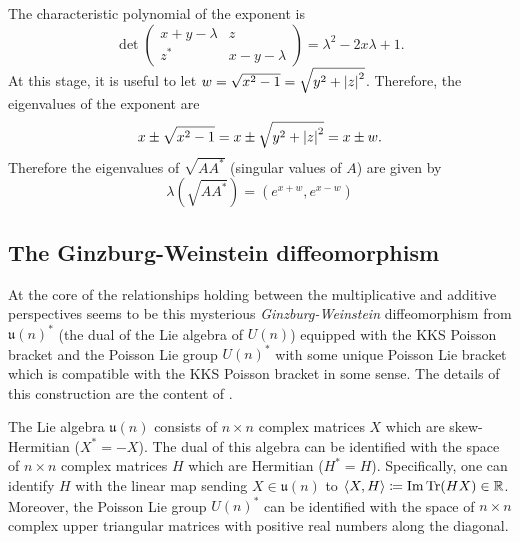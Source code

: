 \documentclass[notitlepage]{article}
\begin{document}
The characteristic polynomial of the exponent is
\begin{equation}
    \det\begin{pmatrix} x+y-\lambda & z \\ z^* & x-y-\lambda \end{pmatrix} = \lambda^2 - 2x \lambda + 1.
\end{equation}
At this stage, it is useful to let $w = \sqrt{x^2 - 1} = \sqrt{y^2 + \left|z\right|^2}$.
Therefore, the eigenvalues of the exponent are 
\begin{equation}
    x \pm \sqrt{x^2 - 1} = x \pm \sqrt{y^2 + \left|z\right|^2} = x \pm w.
\end{equation}
Therefore the eigenvalues of $\sqrt{AA^{*}}$ (singular values of $A$) are given by
\begin{equation}
    \lambda(\sqrt{AA^{*}}) = \left(e^{x+w}, e^{x-w} \right)
\end{equation}

\subsection{The Ginzburg-Weinstein diffeomorphism}
At the core of the relationships holding between the multiplicative and additive perspectives seems to be this mysterious \textit{Ginzburg-Weinstein} diffeomorphism from $\mathfrak{u}(n)^*$ (the dual of the Lie algebra of $U(n)$) equipped with the KKS Poisson bracket and the Poisson Lie group $U(n)^*$ with some unique Poisson Lie bracket which is compatible with the KKS Poisson bracket in some sense.
The details of this construction are the content of \citeauthor{alekseev2007ginzburg} \cite{alekseev2007ginzburg}.

The Lie algebra $\mathfrak{u}(n)$ consists of $n\times n$ complex matrices $X$ which are skew-Hermitian ($X^* = - X$).
The dual of this algebra can be identified with the space of $n\times n$ complex matrices $H$ which are Hermitian ($H^{*} = H$).
Specifically, one can identify $H$ with the linear map sending $X \in \mathfrak{u}(n)$ to $\braket{X, H} \coloneqq \mathrm{Im}\operatorname{Tr}(HX) \in \mathbb R$.
Moreover, the Poisson Lie group $U(n)^*$ can be identified with the space of $n\times n$ complex upper triangular matrices with positive real numbers along the diagonal.
\end{document}
